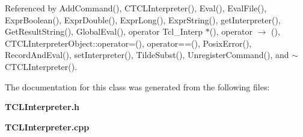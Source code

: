 Referenced by Add\-Command(), CTCLInterpreter(), Eval(), Eval\-File(), Expr\-Boolean(), Expr\-Double(), Expr\-Long(), Expr\-String(), get\-Interpreter(), Get\-Result\-String(), Global\-Eval(), operator Tcl\_\-Interp $\ast$(), operator $\rightarrow$ (), CTCLInterpreter\-Object::operator=(), operator==(), Posix\-Error(), Record\-And\-Eval(), set\-Interpreter(), Tilde\-Subst(), Unregister\-Command(), and $\sim$CTCLInterpreter().

The documentation for this class was generated from the following files:\begin{CompactItemize}
\item 
{\bf TCLInterpreter.h}\item 
{\bf TCLInterpreter.cpp}\end{CompactItemize}
